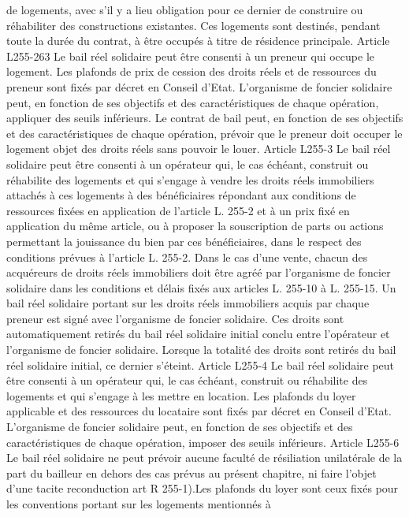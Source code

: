 \documentclass[11pt,a4paper]{report}
\begin{document}
de logements, avec s'il y a lieu obligation pour ce dernier de construire ou réhabiliter des constructions
existantes.
Ces logements sont destinés, pendant toute la durée du contrat, à être occupés à titre de résidence principale.
Article L255-263
Le bail réel solidaire peut être consenti à un preneur qui occupe le logement. Les plafonds de prix de cession des
droits réels et de ressources du preneur sont fixés par décret en Conseil d'Etat.
L'organisme de foncier solidaire peut, en fonction de ses objectifs et des caractéristiques de chaque opération,
appliquer des seuils inférieurs.
Le contrat de bail peut, en fonction de ses objectifs et des caractéristiques de chaque opération, prévoir que le
preneur doit occuper le logement objet des droits réels sans pouvoir le louer.
Article L255-3
Le bail réel solidaire peut être consenti à un opérateur qui, le cas échéant, construit ou réhabilite des logements
et qui s'engage à vendre les droits réels immobiliers attachés à ces logements à des bénéficiaires répondant aux
conditions de ressources fixées en application de l'article L. 255-2 et à un prix fixé en application du même
article, ou à proposer la souscription de parts ou actions permettant la jouissance du bien par ces bénéficiaires,
dans le respect des conditions prévues à l'article L. 255-2.
Dans le cas d'une vente, chacun des acquéreurs de droits réels immobiliers doit être agréé par l'organisme de
foncier solidaire dans les conditions et délais fixés aux articles L. 255-10 à L. 255-15.
Un bail réel solidaire portant sur les droits réels immobiliers acquis par chaque preneur est signé avec
l'organisme de foncier solidaire. Ces droits sont automatiquement retirés du bail réel solidaire initial conclu
entre l'opérateur et l'organisme de foncier solidaire. Lorsque la totalité des droits sont retirés du bail réel
solidaire initial, ce dernier s'éteint.
Article L255-4
Le bail réel solidaire peut être consenti à un opérateur qui, le cas échéant, construit ou réhabilite des logements
et qui s'engage à les mettre en location.
Les plafonds du loyer applicable et des ressources du locataire sont fixés par décret en Conseil d'Etat.
L'organisme de foncier solidaire peut, en fonction de ses objectifs et des caractéristiques de chaque opération,
imposer des seuils inférieurs.
Article L255-6
Le bail réel solidaire ne peut prévoir aucune faculté de résiliation unilatérale de la part du bailleur en dehors
des cas prévus au présent chapitre, ni faire l'objet d'une tacite reconduction
art R 255-1).Les plafonds du loyer sont ceux fixés pour les conventions portant sur les logements mentionnés à
\end{document}
